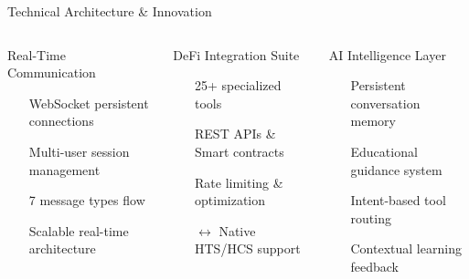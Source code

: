 \documentclass[aspectratio=169]{beamer}
\providecommand{\faExchangeAlt}{\faSync}
\providecommand{\faExpandArrowsAlt}{\ensuremath{\leftrightarrow}}
\providecommand{\faShieldAlt}{\faLock}
\providecommand{\faUsersCog}{\faUsers}
\providecommand{\faNetworkWired}{\faCogs}
\providecommand{\faLayerGroup}{\faCogs}
\begin{document}
\begin{frame}{Technical Architecture \& Innovation}
\vspace{0.05cm}
\begin{columns}
\begin{block}{Real-Time Communication \hfill
{}}
\begin{itemize}
\item[\color{accent}\faPlug] WebSocket persistent connections
\item[\color{accent}\faUsersCog] Multi-user session management
\item[\color{accent}\faExchangeAlt] 7 message types flow
\item[\color{accent}\faNetworkWired] Scalable real-time architecture
\end{itemize}
\end{block}

\begin{block}{DeFi Integration Suite \hfill
{}}
\begin{itemize}
\item[\color{secondary}\faCogs] 25+ specialized tools
\item[\color{secondary}\faShieldAlt] REST APIs \& Smart contracts
\item[\color{secondary}\faExclamationCircle] Rate limiting \& optimization
\item[\color{secondary}\faExpandArrowsAlt] Native HTS/HCS support
\end{itemize}
\end{block}

\begin{block}{AI Intelligence Layer \hfill
{}}
\begin{itemize}
\item[\color{success}\faStopwatch] Persistent conversation memory
\item[\color{success}\faChartLine] Educational guidance system
\item[\color{success}\faLayerGroup] Intent-based tool routing
\item[\color{success}\faLink] Contextual learning feedback
\end{itemize}
\end{block}


\end{columns}
\end{frame}
\end{document}
